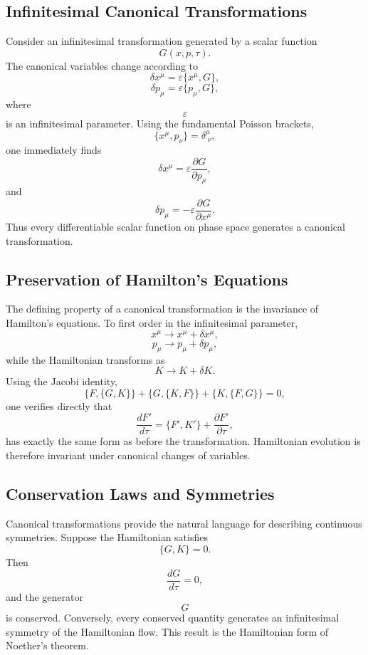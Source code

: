 \subsection{Infinitesimal Canonical Transformations}
Consider an infinitesimal transformation generated by a scalar function
\[G(x,p,\tau).\]
The canonical variables change according to
\[\boxed{\delta x^\mu=\varepsilon\{x^\mu,G\},}\]
\[\boxed{\delta p_\mu=\varepsilon\{p_\mu,G\},}\]
where
\[\varepsilon\]
is an infinitesimal parameter.
Using the fundamental Poisson brackets,
\[\{x^\mu,p_\nu\}=\delta^\mu_{\;\nu},\]
one immediately finds
\[\boxed{\delta x^\mu=\varepsilon\frac{\partial G}{\partial p_\mu},}\]
and
\[\boxed{\delta p_\mu=-\varepsilon\frac{\partial G}{\partial x^\mu}.}\]
Thus every differentiable scalar function on phase space generates a
canonical transformation.
\subsection{Preservation of Hamilton's Equations}
The defining property of a canonical transformation is the invariance of
Hamilton's equations.
To first order in the infinitesimal parameter,
\[x^\mu\rightarrow x^\mu+\delta x^\mu,\]
\[p_\mu\rightarrow p_\mu+\delta p_\mu,\]
while the Hamiltonian transforms as
\[K\rightarrow K+\delta K.\]
Using the Jacobi identity,
\[\{F,\{G,K\}\}+\{G,\{K,F\}\}+\{K,\{F,G\}\}=0,\]
one verifies directly that
\[\frac{dF'}{d\tau}=\{F',K'\}+\frac{\partial F'}{\partial\tau},\]
has exactly the same form as before the transformation.
Hamiltonian evolution is therefore invariant under canonical changes of
variables.
\subsection{Conservation Laws and Symmetries}
Canonical transformations provide the natural language for describing
continuous symmetries.
Suppose the Hamiltonian satisfies
\[\boxed{\{G,K\}=0.}\]
Then
\[\frac{dG}{d\tau}=0,\]
and the generator
\[G\]
is conserved.
Conversely, every conserved quantity generates an infinitesimal symmetry
of the Hamiltonian flow.
This result is the Hamiltonian form of Noether's theorem.
